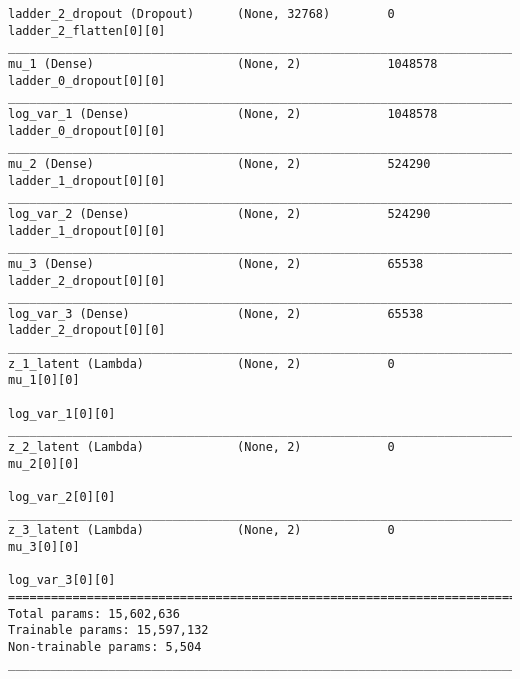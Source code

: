\begin{lstlisting}[caption={CelebA-\ac{VLAE} Encoder},captionpos=b,basicstyle=\tiny, label={lst:celeba-vlae-encoder}]
ladder_2_dropout (Dropout)      (None, 32768)        0           ladder_2_flatten[0][0]
__________________________________________________________________________________________________
mu_1 (Dense)                    (None, 2)            1048578     ladder_0_dropout[0][0]
__________________________________________________________________________________________________
log_var_1 (Dense)               (None, 2)            1048578     ladder_0_dropout[0][0]
__________________________________________________________________________________________________
mu_2 (Dense)                    (None, 2)            524290      ladder_1_dropout[0][0]
__________________________________________________________________________________________________
log_var_2 (Dense)               (None, 2)            524290      ladder_1_dropout[0][0]
__________________________________________________________________________________________________
mu_3 (Dense)                    (None, 2)            65538       ladder_2_dropout[0][0]
__________________________________________________________________________________________________
log_var_3 (Dense)               (None, 2)            65538       ladder_2_dropout[0][0]
__________________________________________________________________________________________________
z_1_latent (Lambda)             (None, 2)            0           mu_1[0][0]
                                                                 log_var_1[0][0]
__________________________________________________________________________________________________
z_2_latent (Lambda)             (None, 2)            0           mu_2[0][0]
                                                                 log_var_2[0][0]
__________________________________________________________________________________________________
z_3_latent (Lambda)             (None, 2)            0           mu_3[0][0]
                                                                 log_var_3[0][0]
==================================================================================================
Total params: 15,602,636
Trainable params: 15,597,132
Non-trainable params: 5,504
__________________________________________________________________________________________________
\end{lstlisting}